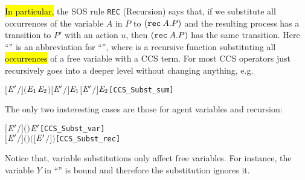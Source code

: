 \hl{In particular,} the SOS rule \texttt{REC} (Recursion)
 says that, if we substitute all occurrences of the variable $A$ in $P$ to
$({\tt rec}\: A . P)$ and the resulting process has a transition to $P'$
with an action $u$, then $({\tt rec}\: A . P)$ has the same
transition. Here ``'' is an abbreviation
for ``'', where  is a
recursive function substituting all \hl{occurrences} of a free variable with a CCS term.
For most CCS operators  just recursively goes into a deeper
level without changing anything, e.g.
\begin{alltt}
\HOLTokenTurnstile{} \ensuremath{[}\ensuremath{\HOLFreeVar{E}\sp{\prime}}\ensuremath{/}\ensuremath{]} \ensuremath{(}\ensuremath{\HOLFreeVar{E}\sb{\mathrm{1}}} \HOLSymConst{\ensuremath{+}} \ensuremath{\HOLFreeVar{E}\sb{\mathrm{2}}}\ensuremath{)} \HOLSymConst{\ensuremath{=}} \ensuremath{[}\ensuremath{\HOLFreeVar{E}\sp{\prime}}\ensuremath{/}\ensuremath{]} \ensuremath{\HOLFreeVar{E}\sb{\mathrm{1}}} \HOLSymConst{\ensuremath{+}} \ensuremath{[}\ensuremath{\HOLFreeVar{E}\sp{\prime}}\ensuremath{/}\ensuremath{]} \ensuremath{\HOLFreeVar{E}\sb{\mathrm{2}}}\hfill{[CCS_Subst_sum]}
\end{alltt}
The only two insteresting cases are those for agent variables and recursion:
\begin{alltt}
\HOLTokenTurnstile{} \ensuremath{[}\ensuremath{\HOLFreeVar{E}\sp{\prime}}\ensuremath{/}\ensuremath{]} \ensuremath{(} \ensuremath{)} \HOLSymConst{\ensuremath{=}}   \HOLSymConst{\ensuremath{=}}   \ensuremath{\HOLFreeVar{E}\sp{\prime}}   \hfill{[CCS_Subst_var]}
\HOLTokenTurnstile{} \ensuremath{[}\ensuremath{\HOLFreeVar{E}\sp{\prime}}\ensuremath{/}\ensuremath{]} \ensuremath{(}  \ensuremath{)} \HOLSymConst{\ensuremath{=}}   \HOLSymConst{\ensuremath{=}}         \ensuremath{(}\ensuremath{[}\ensuremath{\HOLFreeVar{E}\sp{\prime}}\ensuremath{/}\ensuremath{]} \ensuremath{)}\hfill{[CCS_Subst_rec]}
\end{alltt}
Notice that, variable substitutions only affect free
variables. For instance, the variable $Y$ in ``'' is
bound and therefore the substitution ignores it.

